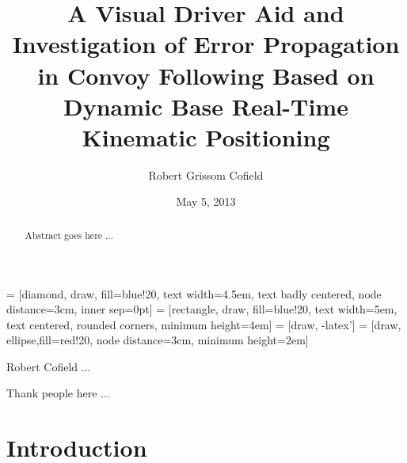 \documentclass[12pt]{report}
\title{A Visual Driver Aid and Investigation of Error Propagation in Convoy Following Based on Dynamic Base Real-Time Kinematic Positioning}
\author{Robert Grissom Cofield}
\date{May 5, 2013}
\begin{document}
 = [diamond, draw, fill=blue!20, text width=4.5em, text badly centered, node distance=3cm, inner sep=0pt]
 = [rectangle, draw, fill=blue!20, text width=5em, text centered, rounded corners, minimum height=4em]
 = [draw, -latex']
 = [draw, ellipse,fill=red!20, node distance=3cm, minimum height=2em]




\begin{romanpages}

\ApprovalPage
\TitlePage
\CopyrightPage

\begin{vita}%
Robert Cofield ...
\end{vita}


\begin{abstract}
Abstract goes here ...
\end{abstract}


\begin{acknowledgments}
Thank people here ...
\end{acknowledgments}


\StylePage

\tableofcontents
\listoffigures
\listoftables

\printnomenclature[0.75in] 

\end{romanpages}

\normalem       %


\chapter{Introduction}
\end{document}
